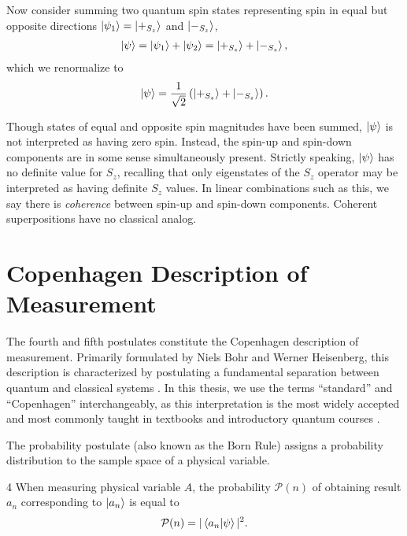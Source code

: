 Now consider summing two quantum spin states representing spin in equal but opposite directions $\ket{\psi_1} = \ket{+_{S_z}}$ and $\ket{-_{S_z}}$,
\begin{align}
  \ket{\psi} = \ket{\psi_1} + \ket{\psi_2} = \ket{+_{S_z}} + \ket{-_{S_z}},
\end{align}
which we renormalize to
\begin{align}
  \ket{\psi} = \frac{1}{\sqrt{2}} \left(\ket{+_{S_z}} + \ket{-_{S_z}} \right).
\end{align}

Though states of equal and opposite spin magnitudes have been summed, $\ket{\psi}$ is not interpreted as having zero spin. Instead, the spin-up and spin-down components are in some sense simultaneously present. Strictly speaking, $\ket{\psi}$ has no definite value for $S_z$, recalling that only eigenstates of the $S_z$ operator may be interpreted as having definite $S_z$ values. In linear combinations such as this, we say there is \textit{coherence} between spin-up and spin-down components. Coherent superpositions have no classical analog.

\section{Copenhagen Description of Measurement}
The fourth and fifth postulates constitute the Copenhagen description of measurement. Primarily formulated by Niels Bohr and Werner Heisenberg, this description is characterized by postulating a fundamental separation between quantum and classical systems \cite{Schlosshauer}. In this thesis, we use the terms ``standard'' and ``Copenhagen'' interchangeably, as this interpretation is the most widely accepted and most commonly taught in textbooks and introductory quantum courses \cite{siddiqui}.

The probability postulate (also known as the Born Rule) assigns a probability distribution to the sample space of a physical variable.
\begin{Thm:Postulate}{4}
    When measuring physical variable $A$, the probability $\mathcal{P}(n)$ of obtaining result $a_n$ corresponding to $\ket{a_n}$  is equal to
     \begin{align}
        \mathcal{P}(n) = |\braket{a_n|\psi}|^2.
    \end{align}
\end{Thm:Postulate}


